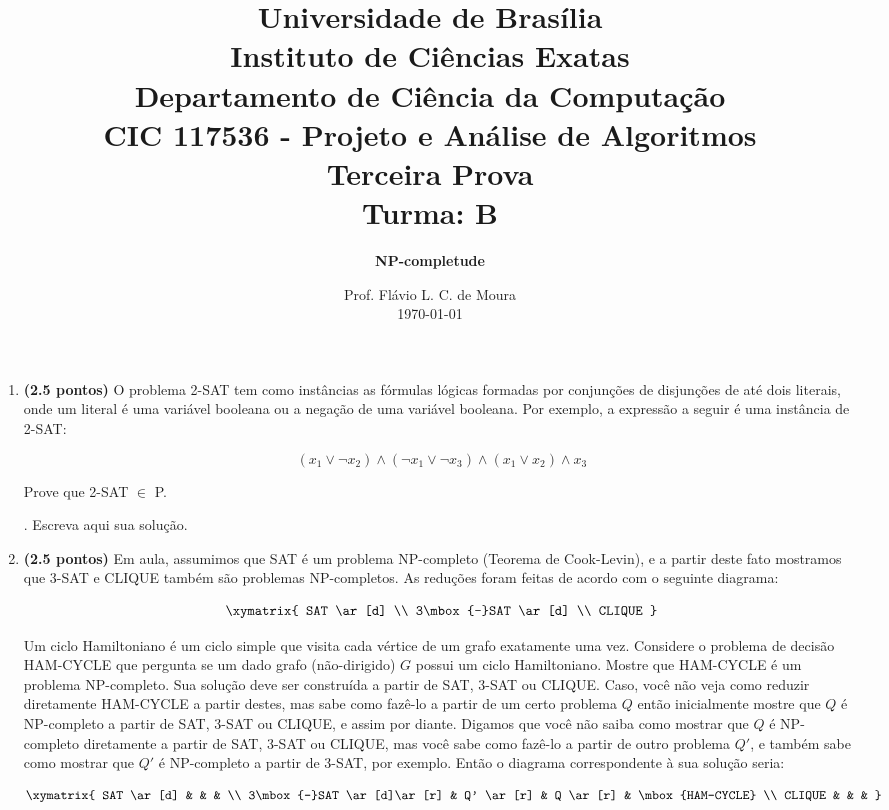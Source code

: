 \documentclass[12pt]{article}
\title{{\large Universidade de Brasília \\ Instituto de Ciências Exatas \\
Departamento de Ciência da Computação} \\[1cm]
CIC 117536 - Projeto e Análise de Algoritmos \\[.5cm]  Terceira Prova \\[.5cm] Turma: B}
\author{{\bf NP-completude}}
\date{Prof. Flávio L. C. de Moura \\[.5cm] \today}
\newcommand{\resposta}[1]{ \noindent {\bf Solução}.{\color{blue} #1}}
\begin{document}
\maketitle

\begin{enumerate}
\item {\bf (2.5 pontos)} O problema 2-SAT tem como instâncias as
  fórmulas lógicas formadas por conjunções de disjunções de até dois
  literais, onde um literal é uma variável booleana ou a negação de
  uma variável booleana. Por exemplo, a expressão a seguir é uma
  instância de 2-SAT:

  $$(x_1\lor \neg x_2)\land (\neg x_1 \lor \neg x_3) \land (x_1 \lor x_2) \land x_3$$

  Prove que 2-SAT $\in$ P.

 
  \resposta{
    Escreva aqui sua solução.
  }
  
\item {\bf (2.5 pontos)} Em aula, assumimos que SAT é um problema
  NP-completo (Teorema de Cook-Levin), e a partir deste fato mostramos
  que 3-SAT e CLIQUE também são problemas NP-completos. As reduções
  foram feitas de acordo com o seguinte diagrama:

  $$\xymatrix{
    SAT \ar[d] \\
    3\mbox{-}SAT \ar[d] \\
    CLIQUE 
  }$$
  
  Um ciclo Hamiltoniano é um ciclo simple que visita cada vértice de
  um grafo exatamente uma vez. Considere o problema de decisão
  HAM-CYCLE que pergunta se um dado grafo (não-dirigido) $G$ possui um
  ciclo Hamiltoniano. Mostre que HAM-CYCLE é um problema
  NP-completo. Sua solução deve ser construída a partir de SAT, 3-SAT
  ou CLIQUE. Caso, você não veja como reduzir diretamente HAM-CYCLE a
  partir destes, mas sabe como fazê-lo a partir de um certo problema
  $Q$ então inicialmente mostre que $Q$ é NP-completo a partir de SAT,
  3-SAT ou CLIQUE, e assim por diante. Digamos que você não saiba como
  mostrar que $Q$ é NP-completo diretamente a partir de SAT, 3-SAT ou
  CLIQUE, mas você sabe como fazê-lo a partir de outro problema $Q'$,
  e também sabe como mostrar que $Q'$ é NP-completo a partir de 3-SAT,
  por exemplo. Então o diagrama correspondente à sua solução seria:

$$\xymatrix{
  SAT \ar[d] & & & \\
  3\mbox{-}SAT \ar[d]\ar[r] & Q' \ar[r] & Q \ar[r] & \mbox{HAM-CYCLE}  \\
  CLIQUE & & & 
}$$


\end{enumerate}
\end{document}
